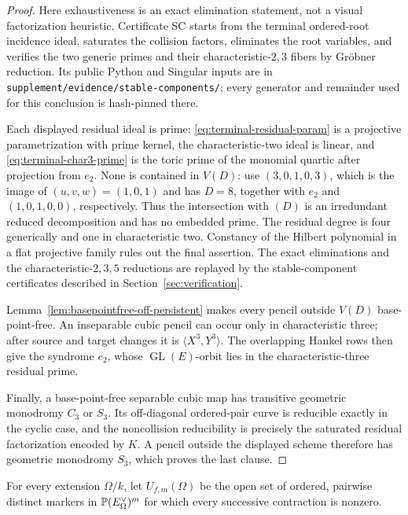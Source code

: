 \begin{proof}
Here exhaustiveness is an exact elimination statement, not a visual
factorization heuristic.  Certificate SC starts from the terminal
ordered-root incidence ideal, saturates the collision factors, eliminates
the root variables, and verifies the two generic primes and their
characteristic-\(2,3\) fibers by Gröbner reduction.  Its public Python and
Singular inputs are in
\texttt{supplement/evidence/stable-components/}; every generator and
remainder used for this conclusion is hash-pinned there.

Each displayed residual ideal is prime:
\eqref{eq:terminal-residual-param} is a projective parametrization with prime
kernel, the characteristic-two ideal is linear, and
\eqref{eq:terminal-char3-prime} is the
toric prime of the monomial quartic after projection from \(e_2\).  None is
contained in \(V(D)\): use \((3,0,1,0,3)\), which is the image of
\((u,v,w)=(1,0,1)\) and has \(D=8\), together with \(e_2\) and
\((1,0,1,0,0)\), respectively.  Thus the intersection with \((D)\) is an
irredundant reduced decomposition and has no embedded prime.  The residual
degree is four generically and one in characteristic two.  Constancy of the
Hilbert polynomial in a flat projective family rules out the final assertion.
The exact eliminations and the characteristic-\(2,3,5\) reductions are
replayed by the stable-component certificates described in
Section~\ref{sec:verification}.

Lemma~\ref{lem:basepointfree-off-persistent} makes every pencil outside
\(V(D)\) base-point-free.  An inseparable cubic pencil can occur only in
characteristic three; after source and target changes it is
\(\langle X^3,Y^3\rangle\).  The overlapping Hankel rows then give the
syndrome \(e_2\), whose \(\operatorname{GL}(E)\)-orbit lies in the
characteristic-three residual prime.

Finally, a base-point-free separable cubic map has transitive geometric
monodromy \(C_3\) or \(S_3\).  Its off-diagonal ordered-pair curve is
reducible exactly in the cyclic case, and the noncollision reducibility is
precisely the saturated residual factorization encoded by \(K\).  A pencil
outside the displayed scheme therefore has geometric monodromy \(S_3\),
which proves the last clause.
\end{proof}

For every extension \(\Omega/k\), let \(U_{f,m}(\Omega)\) be the open set of
ordered, pairwise distinct markers in \(\mathbb P(E^\vee_\Omega)^m\) for which every
successive contraction is nonzero.

